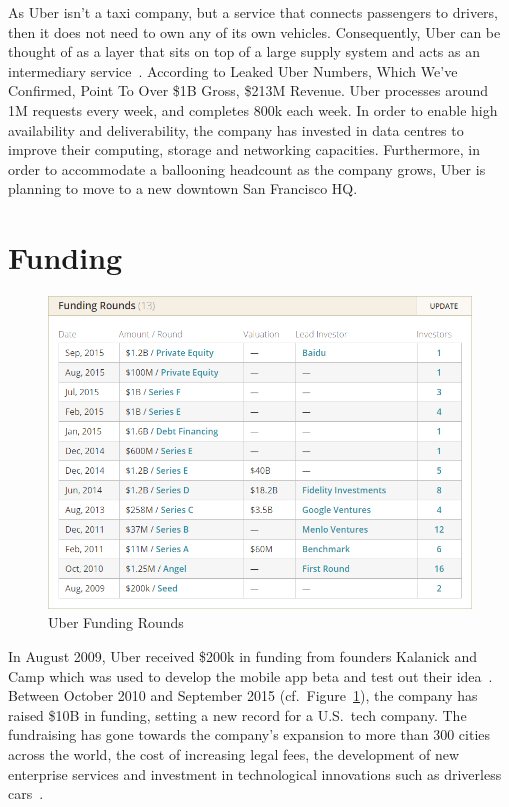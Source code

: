    As Uber isn't a taxi company, but a service that connects passengers to drivers, then it does not need to own any of its own vehicles. Consequently, Uber can be thought of as a layer that sits on top of a large supply system and acts as an intermediary service~\parencite{goodwin2015}. According to \parencite{panzarino2013} Leaked Uber Numbers, Which We've Confirmed, Point To Over \$1B Gross, \$213M Revenue. Uber processes around 1M requests every week, and completes 800k each week. In order to enable high availability and deliverability, the company has invested in data centres to improve their computing, storage and networking capacities. Furthermore, in order to accommodate a ballooning headcount as the company grows, Uber is planning to move to a new downtown San Francisco HQ.

  \section{Funding}\label{sec:funding}

    \begin{figure}
      \centering
      \begin{minipage}{12cm}
        \centering
        \includegraphics[width=12cm]{inc/uber_funding_rounds.png}
        \caption[Uber Funding Rounds]{Uber Funding Rounds~\parencite{}}
        \label{fig:uber_funding_rounds}
      \end{minipage}
    \end{figure}

    In August 2009, Uber received \$200k in funding from founders Kalanick and Camp which was used to develop the mobile app beta and test out their idea~\parencite{joshi2015}. Between October 2010 and September 2015 (cf.\ Figure~\ref{fig:uber_funding_rounds}), the company has raised \$10B in funding, setting a new record for a U.S.\ tech company. The fundraising has gone towards the company's expansion to more than 300 cities across the world, the cost of increasing legal fees, the development of new enterprise services and investment in technological innovations such as driverless cars~\parencite{bradshaw2015}. 
